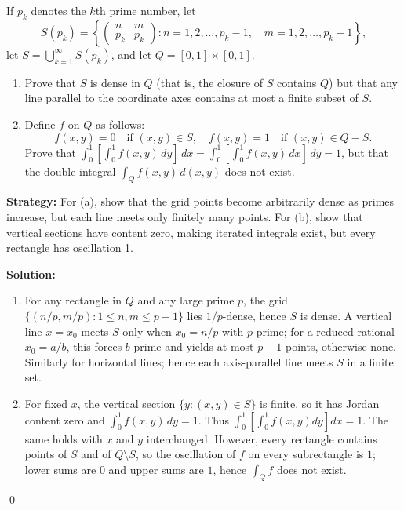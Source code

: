 \begin{problembox}
\begin{problemstatement}
If \( p_k \) denotes the \( k \)th prime number, let
\[S(p_k) = \left\{ \begin{pmatrix}
n & m \\
p_k & p_k
\end{pmatrix} : n = 1, 2, \ldots, p_k - 1, \quad m = 1, 2, \ldots, p_k - 1 \right\},\]
let \( S = \bigcup_{k=1}^{\infty} S(p_k) \), and let \( Q = [0, 1] \times [0, 1] \).

\begin{enumerate}[label=(\alph*)]
    \item Prove that \( S \) is dense in \( Q \) (that is, the closure of \( S \) contains \( Q \)) but that any line parallel to the coordinate axes contains at most a finite subset of \( S \).
    
    \item Define \( f \) on \( Q \) as follows:
    \[f(x, y) = 0 \quad \text{if } (x, y) \in S, \quad f(x, y) = 1 \quad \text{if } (x, y) \in Q - S.\]
    Prove that \( \int_{0}^{1} \left[ \int_{0}^{1} f(x, y) \, dy \right] \, dx = \int_{0}^{1} \left[ \int_{0}^{1} f(x, y) \, dx \right] \, dy = 1 \), but that the double integral \( \int_{Q} f(x, y) \, d(x, y) \) does not exist.
\end{enumerate}
\end{problemstatement}
\end{problembox}

\noindent\textbf{Strategy:} For (a), show that the grid points become arbitrarily dense as primes increase, but each line meets only finitely many points. For (b), show that vertical sections have content zero, making iterated integrals exist, but every rectangle has oscillation 1.

\bigskip\noindent\textbf{Solution:}
\begin{enumerate}[label=(\alph*)]
    \item For any rectangle in $Q$ and any large prime $p$, the grid $\{(n/p,m/p):1\le n,m\le p-1\}$ lies $1/p$-dense, hence $S$ is dense. A vertical line $x=x_0$ meets $S$ only when $x_0=n/p$ with $p$ prime; for a reduced rational $x_0=a/b$, this forces $b$ prime and yields at most $p-1$ points, otherwise none. Similarly for horizontal lines; hence each axis-parallel line meets $S$ in a finite set.
    \item For fixed $x$, the vertical section $\{y:(x,y)\in S\}$ is finite, so it has Jordan content zero and $\int_0^1 f(x,y)\,dy=1$. Thus $\int_0^1\![\int_0^1 f(x,y)dy]dx=1$. The same holds with $x$ and $y$ interchanged. However, every rectangle contains points of $S$ and of $Q\setminus S$, so the oscillation of $f$ on every subrectangle is $1$; lower sums are $0$ and upper sums are $1$, hence $\int_Q f$ does not exist.
\end{enumerate}\qed
